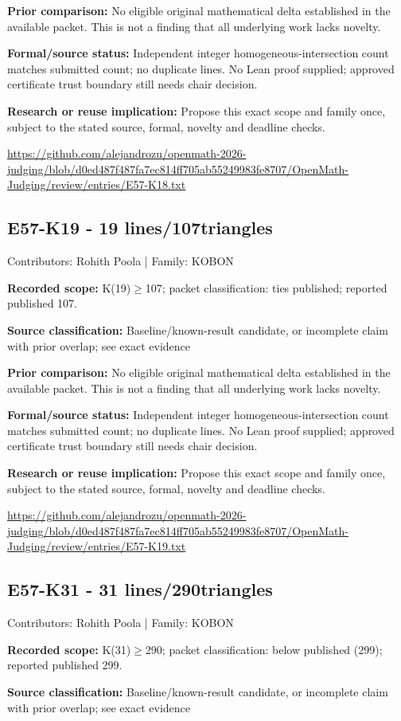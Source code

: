 \documentclass[11pt,a4paper]{article}
\begin{document}
\textbf{Prior comparison:} No eligible original mathematical delta established in the available packet. This is not a finding that all underlying work lacks novelty.

\textbf{Formal/source status:} Independent integer homogeneous-intersection count matches submitted count; no duplicate lines. No Lean proof supplied; approved certificate trust boundary still needs chair decision.

\textbf{Research or reuse implication:} Propose this exact scope and family once, subject to the stated source, formal, novelty and deadline checks.

{\small \url{https://github.com/alejandrozu/openmath-2026-judging/blob/d0ed487f487fa7ec814ff705ab55249983fe8707/OpenMath-Judging/review/entries/E57-K18.txt}\par}

\begin{samepage}
\subsection{E57-K19  -  19 lines/107triangles}
{\small Contributors: Rohith Poola | Family: KOBON\par}

\textbf{Recorded scope:} K(19)\ensuremath{\geq}107; packet classification: ties published; reported published 107.

\end{samepage}
\textbf{Source classification:} Baseline/known-result candidate, or incomplete claim with prior overlap; see exact evidence

\textbf{Prior comparison:} No eligible original mathematical delta established in the available packet. This is not a finding that all underlying work lacks novelty.

\textbf{Formal/source status:} Independent integer homogeneous-intersection count matches submitted count; no duplicate lines. No Lean proof supplied; approved certificate trust boundary still needs chair decision.

\textbf{Research or reuse implication:} Propose this exact scope and family once, subject to the stated source, formal, novelty and deadline checks.

{\small \url{https://github.com/alejandrozu/openmath-2026-judging/blob/d0ed487f487fa7ec814ff705ab55249983fe8707/OpenMath-Judging/review/entries/E57-K19.txt}\par}

\begin{samepage}
\subsection{E57-K31  -  31 lines/290triangles}
{\small Contributors: Rohith Poola | Family: KOBON\par}

\textbf{Recorded scope:} K(31)\ensuremath{\geq}290; packet classification: below published (299); reported published 299.

\end{samepage}
\textbf{Source classification:} Baseline/known-result candidate, or incomplete claim with prior overlap; see exact evidence
\end{document}

